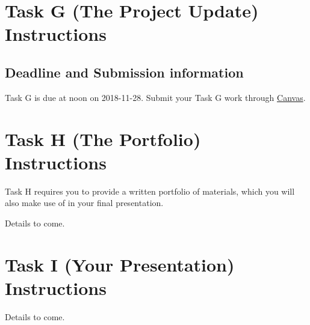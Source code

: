 \documentclass[]{book}
\theoremstyle{definition}
\theoremstyle{definition}
\theoremstyle{definition}
\theoremstyle{remark}
\begin{document}
\hypertarget{taskG}{%
\chapter{Task G (The Project Update) Instructions}\label{taskG}}

\hypertarget{deadline-and-submission-information-6}{%
\section{Deadline and Submission
information}\label{deadline-and-submission-information-6}}

Task G is due at noon on 2018-11-28. Submit your Task G work through
\href{https://canvas.case.edu/}{Canvas}.

\hypertarget{taskH}{%
\chapter{Task H (The Portfolio) Instructions}\label{taskH}}

Task H requires you to provide a written portfolio of materials, which
you will also make use of in your final presentation.

Details to come.

\hypertarget{taskI}{%
\chapter{Task I (Your Presentation) Instructions}\label{taskI}}

Details to come.


\end{document}
